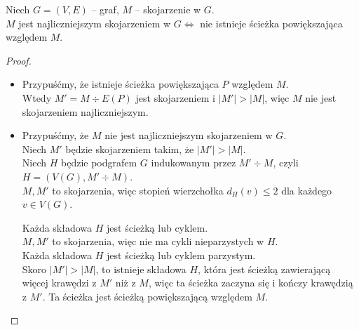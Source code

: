 \begin{obowiazkowy}
  \begin{theorem}[Berge'a] \label{theorem:berge}
		Niech $G=(V,E)$ -- graf, $M$ -- skojarzenie w $G$. \\
		$M$ jest najliczniejszym skojarzeniem w $G \iff$ nie istnieje ścieżka powiększająca względem $M$.
	\end{theorem}

	\begin{proof} ~
		\begin{itemize}
			\item[$\implies$]
			      Przypuśćmy, że istnieje ścieżka powiększająca $P$ względem $M$. \\
			      Wtedy $M' = M \div E(P)$ jest skojarzeniem i $|M'| > |M|$, więc $M$ nie jest skojarzeniem najliczniejszym.
			\item[$\impliedby$]
			      Przypuśćmy, że $M$ nie jest najliczniejszym skojarzeniem w $G$. \\
			      Niech $M'$ będzie skojarzeniem takim, że $|M'| > |M|$. \\
			      Niech $H$ będzie podgrafem $G$ indukowanym przez $M' \div M$, czyli $H = (V(G), M' \div M)$. \\
			      $M, M'$ to skojarzenia, więc stopień wierzchołka $d_H(v) \le 2$ dla każdego $v \in V(G)$.

			      Każda składowa $H$ jest ścieżką lub cyklem. \\
			      $M, M'$ to skojarzenia, więc nie ma cykli nieparzystych w $H$. \\
			      Każda składowa $H$ jest ścieżką lub cyklem parzystym. \\
			      Skoro $|M'| > |M|$, to istnieje składowa $H$, która jest ścieżką zawierającą więcej krawędzi z $M'$ niż z $M$, więc ta ścieżka zaczyna się i kończy krawędzią z $M'$. Ta ścieżka jest ścieżką powiększającą względem $M$. \qedhere
		\end{itemize}
	\end{proof}
\end{obowiazkowy}
